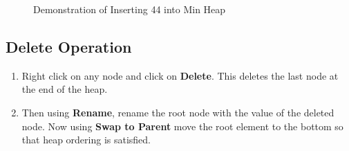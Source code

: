 \documentclass[aps,letterpaper,12pt]{revtex4}
\begin{document}
\begin{figure}[H]
\hspace{0.1cm}
\caption{Demonstration of Inserting 44 into Min Heap}
\label{fig:insertion}    
\end{figure}

\subsection{Delete Operation}
\begin{enumerate}
\item Right click on any node and click on \textbf{Delete}. This deletes the last node at the end of the heap.
\item Then using \textbf{Rename}, rename the root node with the value of the deleted node. Now using \textbf{Swap to Parent} move the root element to the bottom so that heap ordering is satisfied.
\end{enumerate}
\end{document}
